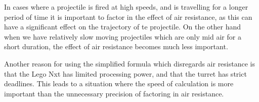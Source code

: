 In cases where a projectile is fired at high speeds, and is travelling for a
longer period of time it is important to factor in the effect of air resistance,
as this can have a significant effect on the trajectory of te projectile. On the
other hand when we have relatively slow moving projectiles which are only mid
air for a short duration, the effect of air resistance becomes much less
important.\nl

Another reason for using the simplified formula which disregards air resistance
is that the Lego Nxt has limited processing power, and that the turret has
strict deadlines. This leads to a situation where the speed of calculation is
more important than the unnecessary precision of factoring in air resistance.



% 

